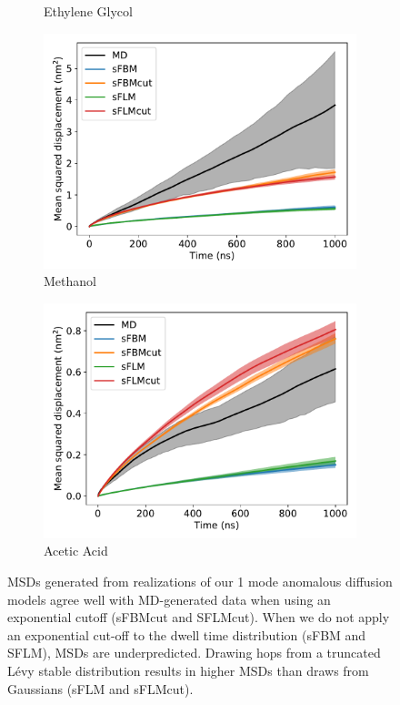 \documentclass{article}
\begin{document}
\begin{figure}
\begin{subfigure}{0.45\textwidth}
  \caption{Ethylene Glycol}\label{fig:1mode_msd_comparison_GCL}
  \end{subfigure}
  \begin{subfigure}{0.45\textwidth}
  \includegraphics[width=\textwidth]{1mode_msd_comparison_MET.pdf}
  \caption{Methanol}\label{fig:1mode_msd_comparison_MET}
  \end{subfigure}
  \begin{subfigure}{0.45\textwidth}
  \includegraphics[width=\textwidth]{1mode_msd_comparison_ACH.pdf}
  \caption{Acetic Acid}\label{fig:1mode_msd_comparison_ACH}
  \end{subfigure}
  \caption{MSDs generated from realizations of our 1 mode anomalous diffusion models
  agree well with MD-generated data when using an exponential cutoff (sFBMcut and SFLMcut).
  When we do not apply an exponential cut-off to the dwell time distribution (sFBM 
  and SFLM), MSDs are underpredicted. Drawing hops from a truncated L\'evy stable 
  distribution results in higher MSDs than draws from Gaussians (sFLM and sFLMcut).}\label{fig:anomalous_msds_1mode}
  \end{figure}
  
\end{document}
